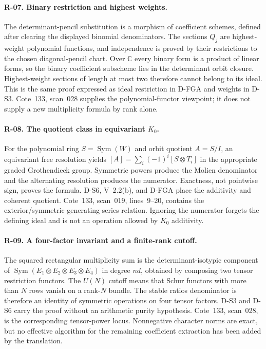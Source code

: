 \documentclass[11pt,a4paper]{article}
\theoremstyle{definition}\newtheorem{definition}{Definition}
\begin{document}
\paragraph{R-07. Binary restriction and highest weights.}
The determinant-pencil substitution is a morphism of coefficient schemes, defined after clearing the displayed binomial denominators. The sections $Q_j$ are highest-weight polynomial functions, and independence is proved by their restrictions to the chosen diagonal-pencil chart. Over $\mathbb C$ every binary form is a product of linear forms, so the binary coefficient subscheme lies in the determinant orbit closure. Highest-weight sections of length at most two therefore cannot belong to its ideal. This is the same proof expressed as ideal restriction in D-FGA and weights in D-S3. Cote~133, scan~028 supplies the polynomial-functor viewpoint; it does not supply a new multiplicity formula by rank alone.

\paragraph{R-08. The quotient class in equivariant $K_0$.}
For the polynomial ring $S=\operatorname{Sym}(W)$ and orbit quotient $A=S/I$, an equivariant free resolution yields $[A]=\sum_i(-1)^i[S\otimes T_i]$ in the appropriate graded Grothendieck group. Symmetric powers produce the Molien denominator and the alternating resolution produces the numerator. Exactness, not pointwise sign, proves the formula. D-S6, V~2.2(b), and D-FGA place the additivity and coherent quotient. Cote~133, scan~019, lines~9--20, contains the exterior/symmetric generating-series relation. Ignoring the numerator forgets the defining ideal and is not an operation allowed by $K_0$ additivity.

\paragraph{R-09. A four-factor invariant and a finite-rank cutoff.}
The squared rectangular multiplicity sum is the determinant-isotypic component of $\operatorname{Sym}(E_1\otimes E_2\otimes E_3\otimes E_4)$ in degree $nd$, obtained by composing two tensor restriction functors. The $U(N)$ cutoff means that Schur functors with more than $N$ rows vanish on a rank-$N$ bundle. The stable ratios denominator is therefore an identity of symmetric operations on four tensor factors. D-S3 and D-S6 carry the proof without an arithmetic purity hypothesis. Cote~133, scan~028, is the corresponding tensor-power locus. Nonnegative character norms are exact, but no effective algorithm for the remaining coefficient extraction has been added by the translation.
\end{document}
